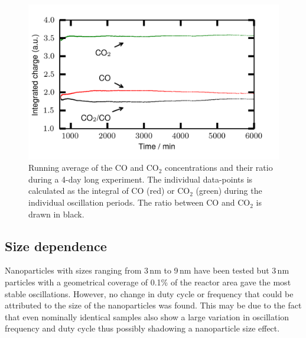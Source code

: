\documentclass[journal=jacsat,manuscript=article]{achemso}
\begin{document}
\begin{figure}
  \includegraphics[width=12cm]{duty_cycles_long_measurement_supplemental.png}
  \caption{Running average of the CO and CO$_2$ concentrations and their ratio during a 4-day long
  experiment. The individual data-points is calculated as the integral of CO
  (red) or CO$_2$ (green) during the individual oscillation periods. The ratio between
  CO and CO$_2$ is drawn in black.} \label{fgr:duty_cycles_supplemental}
\end{figure}

\subsection{Size dependence}
Nanoparticles with sizes ranging from 3\,nm to 9\,nm have been tested but 3\,nm
particles with a geometrical coverage of 0.1\% of the reactor area gave the
most stable oscillations. 
However, no change in duty cycle or frequency that could be
attributed to the size of the nanoparticles was found. This may be due to the
fact that even nominally identical samples also show a large variation in
oscillation frequency and duty cycle thus possibly shadowing a nanoparticle
size effect.
\end{document}
